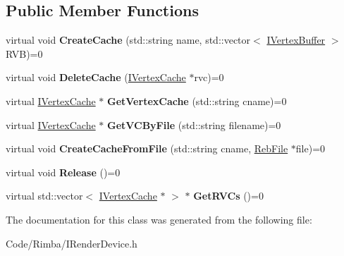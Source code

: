 \subsection*{Public Member Functions}
\begin{DoxyCompactItemize}
\item 
virtual void {\bfseries Create\+Cache} (std\+::string name, std\+::vector$<$ \hyperlink{class_i_vertex_buffer}{I\+Vertex\+Buffer} $>$ R\+VB)=0\hypertarget{class_i_vertex_cache_manager_a75ecdec282d26db77e596316208a2060}{}\label{class_i_vertex_cache_manager_a75ecdec282d26db77e596316208a2060}

\item 
virtual void {\bfseries Delete\+Cache} (\hyperlink{class_i_vertex_cache}{I\+Vertex\+Cache} $\ast$rvc)=0\hypertarget{class_i_vertex_cache_manager_afd26ce03ebe670b22e027636239ff0ab}{}\label{class_i_vertex_cache_manager_afd26ce03ebe670b22e027636239ff0ab}

\item 
virtual \hyperlink{class_i_vertex_cache}{I\+Vertex\+Cache} $\ast$ {\bfseries Get\+Vertex\+Cache} (std\+::string cname)=0\hypertarget{class_i_vertex_cache_manager_affefebf1a1b734c79cccd4d6fcb06e28}{}\label{class_i_vertex_cache_manager_affefebf1a1b734c79cccd4d6fcb06e28}

\item 
virtual \hyperlink{class_i_vertex_cache}{I\+Vertex\+Cache} $\ast$ {\bfseries Get\+V\+C\+By\+File} (std\+::string filename)=0\hypertarget{class_i_vertex_cache_manager_abc3a2b2201210994074a9aa3ba4f413c}{}\label{class_i_vertex_cache_manager_abc3a2b2201210994074a9aa3ba4f413c}

\item 
virtual void {\bfseries Create\+Cache\+From\+File} (std\+::string cname, \hyperlink{class_reb_file}{Reb\+File} $\ast$file)=0\hypertarget{class_i_vertex_cache_manager_a9cb416e026f024de88f05558b58492bd}{}\label{class_i_vertex_cache_manager_a9cb416e026f024de88f05558b58492bd}

\item 
virtual void {\bfseries Release} ()=0\hypertarget{class_i_vertex_cache_manager_a963ff6d6dea612671cb5b49922d4359e}{}\label{class_i_vertex_cache_manager_a963ff6d6dea612671cb5b49922d4359e}

\item 
virtual std\+::vector$<$ \hyperlink{class_i_vertex_cache}{I\+Vertex\+Cache} $\ast$ $>$ $\ast$ {\bfseries Get\+R\+V\+Cs} ()=0\hypertarget{class_i_vertex_cache_manager_a5796a512336d9c2b18d55f5f39b6ad36}{}\label{class_i_vertex_cache_manager_a5796a512336d9c2b18d55f5f39b6ad36}

\end{DoxyCompactItemize}


The documentation for this class was generated from the following file\+:\begin{DoxyCompactItemize}
\item 
Code/\+Rimba/I\+Render\+Device.\+h\end{DoxyCompactItemize}
